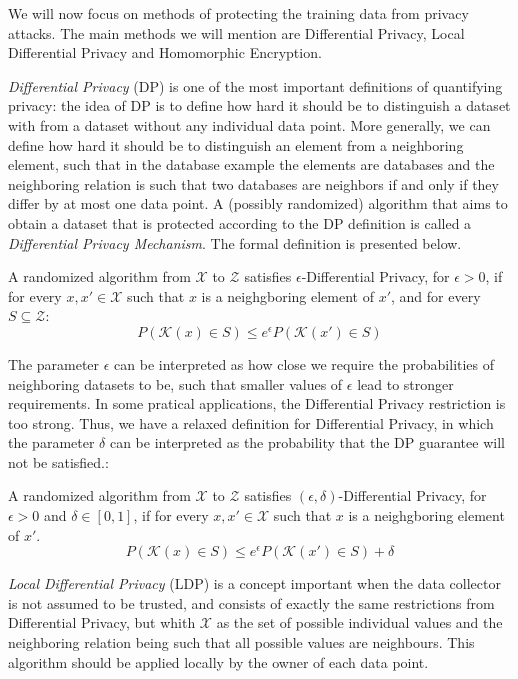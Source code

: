 We will now focus on methods of protecting the training data from privacy attacks. The main methods we will mention are Differential Privacy, Local Differential Privacy and Homomorphic Encryption.

\emph{Differential Privacy} (DP) is one of the most important definitions of quantifying privacy: the idea of DP is to define how hard it should be to distinguish a dataset with from a dataset without any individual data point. More generally, we can define how hard it should be to distinguish an element from a neighboring element, such that in the database example the elements are databases and the neighboring relation is such that two databases are neighbors if and only if they differ by at most one data point. A (possibly randomized) algorithm that aims to obtain a dataset that is protected according to the DP definition is called a \emph{Differential Privacy Mechanism}. The formal definition is presented below. 

\begin{definition} A randomized algorithm from $\mathcal{X}$ to $\mathcal{Z}$ satisfies $\epsilon$-Differential Privacy, for $\epsilon > 0$, if for every $x,x' \in \mathcal{X}$ such that $x$ is a neighgboring element of $x'$, and for every $S \subseteq \mathcal{Z}$:
$$P(\mathcal{K}(x) \in S) \leq e^\epsilon P(\mathcal{K}(x')\in S)$$
\end{definition}

The parameter $\epsilon$ can be interpreted as how close we require the probabilities of neighboring datasets to be, such that smaller values of $\epsilon$ lead to stronger requirements. In some pratical applications, the Differential Privacy restriction is too strong. Thus, we have a relaxed definition for Differential Privacy, in which the parameter $\delta$ can be interpreted as the probability that the DP guarantee will not be satisfied.:

\begin{definition} A randomized algorithm from $\mathcal{X}$ to $\mathcal{Z}$ satisfies $(\epsilon,\delta)$-Differential Privacy, for $\epsilon > 0$ and $\delta \in [0,1]$, if for every $x,x' \in \mathcal{X}$ such that $x$ is a neighgboring element of $x'$.
$$P(\mathcal{K}(x) \in S) \leq e^\epsilon P(\mathcal{K}(x')\in S)+\delta$$
\end{definition}

\emph{Local Differential Privacy} (LDP) is a concept important when the data collector is not assumed to be trusted, and consists of exactly the same restrictions from Differential Privacy, but whith $\mathcal{X}$ as the set of possible individual values and the neighboring relation being such that all possible values are neighbours. This algorithm should be applied locally by the owner of each data point.

